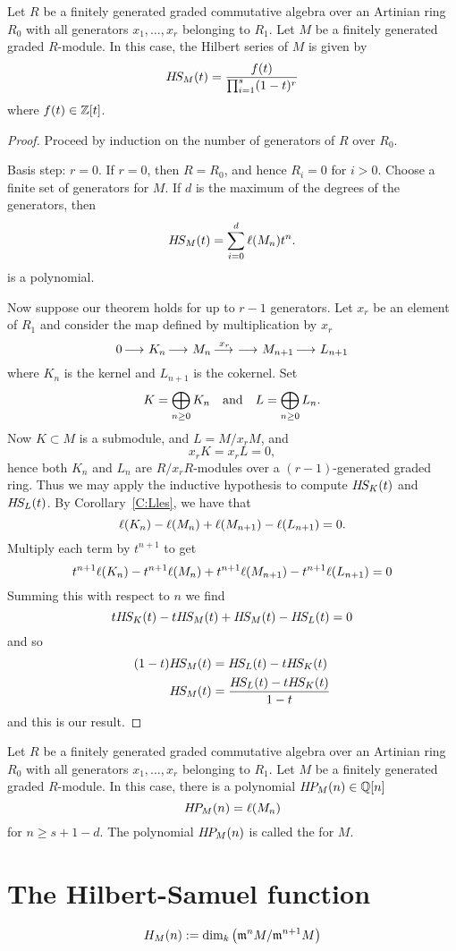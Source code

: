 \documentclass{ximera}
\begin{document}
\begin{theorem}
  Let $R$ be a finitely generated graded commutative algebra over an
  Artinian ring $R_0$ with all generators $x_1,\dots,x_r$ belonging to
  $R_1$. Let $M$ be a finitely generated graded $R$-module. In this
  case, the Hilbert series of $M$ is given by
  \[
  H\!S_M(t) = \frac{f(t)}{\prod_{i=1}^s(1-t)^r}
  \]
  where $f(t)\in\mathbb Z[t]$.
  \begin{proof}
    Proceed by induction on the number of generators of $R$ over
    $R_0$.

    Basis step: $r =0$. If $r=0$, then $R=R_0$, and hence $R_i = 0$
    for $i>0$. Choose a finite set of generators for $M$. If $d$ is
    the maximum of the degrees of the generators, then 
    \[
    H\!S_M(t) = \sum_{i=0}^d \ell(M_n) t^n.
    \]
    is a polynomial.

    Now suppose our theorem holds for up to $r-1$ generators. Let
    $x_r$ be an element of $R_1$ and consider the map defined by
    multiplication by $x_r$
    \[
    0\mathop{\longrightarrow\,}\limits K_n \mathop{\longrightarrow\,}\limits M_n \mathop{\longrightarrow\,}\limits^{x_r} \mathop{\longrightarrow\,}\limits M_{n+1} \mathop{\longrightarrow\,}\limits L_{n+1}
    \]
    where $K_n$ is the kernel and $L_{n+1}$ is the cokernel. Set
    \[
    K = \bigoplus_{n\ge 0} K_n\quad\text{and}\quad L = \bigoplus_{n\ge 0} L_n.
    \]
    Now $K\subset M$ is a submodule, and $L = M/x_r M$, and
    \[
    x_r K = x_r L = 0,
    \]
    hence both $K_n$ and $L_n$ are $R/x_r R$-modules over a
    $(r-1)$-generated graded ring. Thus we may apply the inductive
    hypothesis to compute $H\!S_K(t)$ and $H\!S_L(t)$. By
    Corollary~\ref{C:Lles}, we have that
    \[
    \ell(K_n)-\ell(M_n) + \ell(M_{n+1}) -\ell(L_{n+1}) = 0.
    \]
    Multiply each term by $t^{n+1}$ to get
    \[
    t^{n+1}\ell(K_n)-t^{n+1}\ell(M_n) + t^{n+1}\ell(M_{n+1}) -t^{n+1}\ell(L_{n+1}) = 0
    \]
    Summing this with respect to $n$ we find
    \[
    tH\!S_K(t) - tH\!S_M(t)  + H\!S_M(t) - H\!S_L(t) = 0
    \]
    and so
    \begin{align*}
      (1-t)H\!S_M(t) &= H\!S_L(t) - tH\!S_K(t)\\
      H\!S_M(t) &= \frac{H\!S_L(t) - tH\!S_K(t)}{1-t}
    \end{align*}
    and this is our result.
  \end{proof}
\end{theorem}

\begin{corollary}
  Let $R$ be a finitely generated graded commutative algebra over an
  Artinian ring $R_0$ with all generators $x_1,\dots,x_r$ belonging to
  $R_1$. Let $M$ be a finitely generated graded $R$-module. In this
  case, there is a polynomial $H\!P_M(n)\in\mathbb Q[n]$
  \[
  H\!P_M(n) = \ell(M_n)
  \]
  for $n\ge s+1-d$. The polynomial $H\!P_M(n)$ is called the
   for $M$.
\end{corollary}




\section{The Hilbert-Samuel function}
\[
H_M(n) := \dim_{k}\left(\mathfrak{m}^n M/\mathfrak{m}^{n+1} M\right)
\]
\end{document}

